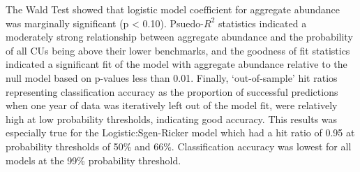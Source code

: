 \documentclass[11pt]{book}
\begin{document}
The Wald Test showed that logistic model coefficient for aggregate abundance was marginally significant (p \textless{} 0.10). Psuedo-\(R^2\) statistics indicated a moderately strong relationship between aggregate abundance and the probability of all CUs being above their lower benchmarks, and the goodness of fit statistics indicated a significant fit of the model with aggregate abundance relative to the null model based on p-values less than 0.01. Finally, `out-of-sample' hit ratios representing classification accuracy as the proportion of successful predictions when one year of data was iteratively left out of the model fit, were relatively high at low probability thresholds, indicating good accuracy. This results was especially true for the Logistic:Sgen-Ricker model which had a hit ratio of 0.95 at probability thresholds of 50\% and 66\%. Classification accuracy was lowest for all models at the 99\% probability threshold.
\end{document}
